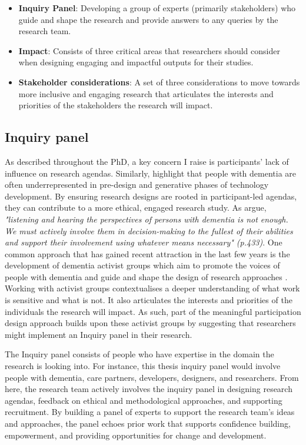 \begin{itemize}
    \item \textbf{Inquiry Panel}: Developing a group of experts (primarily stakeholders) who guide and shape the research and provide answers to any queries by the research team.
    \item \textbf{Impact}: Consists of three critical areas that researchers should consider when designing engaging and impactful outputs for their studies.
    \item \textbf{Stakeholder considerations}: A set of three considerations to move towards more inclusive and engaging research that articulates the interests and priorities of the stakeholders the research will impact.
\end{itemize}

\subsection{Inquiry panel}
\label{Inquiry Panel}
As described throughout the PhD, a key concern I raise is participants' lack of influence on research agendas. Similarly, \cite{suijkerbuijk_active_2019} highlight that people with dementia are often underrepresented in pre-design and generative phases of technology development. By ensuring research designs are rooted in participant-led agendas, they can contribute to a more ethical, engaged research study. As \cite{dupuis_moving_2012} argue, \textit{"listening and hearing the perspectives of persons with dementia is not enough. We must actively involve them in decision-making to the fullest of their abilities and support their involvement using whatever means necessary" (p.433)}. One common approach that has gained recent attraction in the last few years is the development of dementia activist groups which aim to promote the voices of people with dementia and guide and shape the design of research approaches \citep{weetch2021involvement}. Working with activist groups contextualises a deeper understanding of what work is sensitive and what is not. It also articulates the interests and priorities of the individuals the research will impact. As such, part of the meaningful participation design approach builds upon these activist groups by suggesting that researchers might implement an Inquiry panel in their research.

The Inquiry panel consists of people who have expertise in the domain the research is looking into. For instance, this thesis inquiry panel would involve people with dementia, care partners, developers, designers, and researchers. From here, the research team actively involves the inquiry panel in designing research agendas, feedback on ethical and methodological approaches, and supporting recruitment. By building a panel of experts to support the research team's ideas and approaches, the panel echoes prior work that supports confidence building, empowerment, and providing opportunities for change and development.

